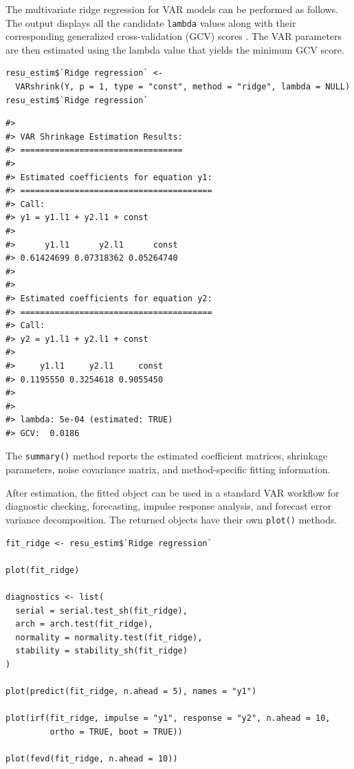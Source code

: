 The multivariate ridge regression for VAR
models can be performed as follows. The output displays all the candidate
\texttt{lambda} values along with their corresponding generalized cross-validation (GCV) scores \citep{Golub79}. The VAR parameters are then estimated using the lambda value that yields the minimum GCV score.

\begin{verbatim}
resu_estim$`Ridge regression` <-
  VARshrink(Y, p = 1, type = "const", method = "ridge", lambda = NULL)
resu_estim$`Ridge regression`
\end{verbatim}

\begin{verbatim}
#> 
#> VAR Shrinkage Estimation Results:
#> ================================= 
#> 
#> Estimated coefficients for equation y1: 
#> ======================================= 
#> Call:
#> y1 = y1.l1 + y2.l1 + const 
#> 
#>      y1.l1      y2.l1      const 
#> 0.61424699 0.07318362 0.05264740 
#> 
#> 
#> Estimated coefficients for equation y2: 
#> ======================================= 
#> Call:
#> y2 = y1.l1 + y2.l1 + const 
#> 
#>     y1.l1     y2.l1     const 
#> 0.1195550 0.3254618 0.9055450 
#> 
#> 
#> lambda: 5e-04 (estimated: TRUE) 
#> GCV:  0.0186
\end{verbatim}

The \texttt{summary()} method reports the estimated coefficient matrices,
shrinkage parameters, noise covariance matrix, and method-specific fitting
information.

After estimation, the fitted object can be used in a standard VAR workflow
for diagnostic checking, forecasting, impulse response analysis, and
forecast error variance decomposition. The returned objects have their own
\texttt{plot()} methods.

\begin{verbatim}
fit_ridge <- resu_estim$`Ridge regression`

plot(fit_ridge)

diagnostics <- list(
  serial = serial.test_sh(fit_ridge),
  arch = arch.test(fit_ridge),
  normality = normality.test(fit_ridge),
  stability = stability_sh(fit_ridge)
)

plot(predict(fit_ridge, n.ahead = 5), names = "y1")

plot(irf(fit_ridge, impulse = "y1", response = "y2", n.ahead = 10,
         ortho = TRUE, boot = TRUE))

plot(fevd(fit_ridge, n.ahead = 10))
\end{verbatim}

